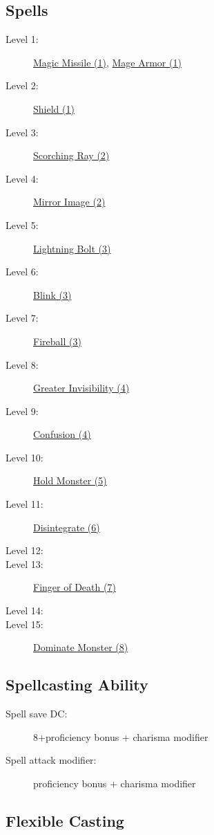 \documentclass[letterpaper,10pt,twoside,twocolumn,openany]{book}
\begin{document}
\subsection{Spells}

\begin{description}
	\item[Level 1:] \hyperlink{Magic Missile (1)}{Magic Missile (1)}, \hyperlink{Mage Armor (1)}{Mage Armor (1)}
	\item[Level 2:] \hyperlink{Shield (1)}{Shield (1)}
	\item[Level 3:] \hyperlink{Scorching Ray (2)}{Scorching Ray (2)}	 
	\item[Level 4:] \hyperlink{Mirror Image (2)}{Mirror Image (2)}
	\item[Level 5:] \hyperlink{Lightning Bolt (3)}{Lightning Bolt (3)}
	\item[Level 6:] \hyperlink{Blink (3)}{Blink (3)}
	\item[Level 7:] \hyperlink{Fireball (3)}{Fireball (3)}
	\item[Level 8:] \hyperlink{Greater Invisibility (4)}{Greater Invisibility (4)}
	\item[Level 9:] \hyperlink{Confusion (4)}{Confusion (4)}
	\item[Level 10:] \hyperlink{Hold Monster (5)}{Hold Monster (5)}
	\item[Level 11:] \hyperlink{Disintegrate (6)}{Disintegrate (6)}
	\item[Level 12:]
	\item[Level 13:] \hyperlink{Finger of Death (7)}{Finger of Death (7)}
	\item[Level 14:] 
	\item[Level 15:] \hyperlink{Dominate Monster (8)}{Dominate Monster (8)}
\end{description}

\subsection{Spellcasting Ability}

\begin{description}
	\item[Spell save DC:] 8+proficiency bonus + charisma modifier
	\item[Spell attack modifier:] proficiency bonus + charisma modifier
\end{description}

\subsection{Flexible Casting}
\end{document}
